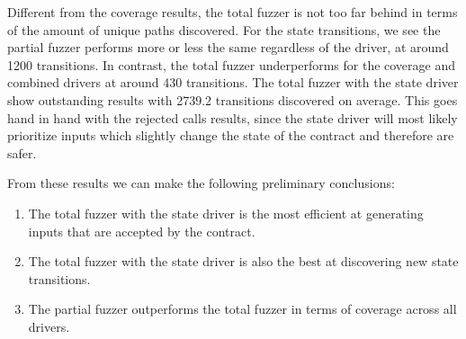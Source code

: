 Different from the coverage results, the total fuzzer is not too far behind in terms of the amount of unique paths discovered.
For the state transitions, we see the partial fuzzer performs more or less the same regardless of the driver, at around 1200 transitions.
In contrast, the total fuzzer underperforms for the coverage and combined drivers at around 430 transitions.
The total fuzzer with the state driver show outstanding results with 2739.2 transitions discovered on average.
This goes hand in hand with the rejected calls results, since the state driver will most likely prioritize inputs which slightly change the state of the contract and therefore are safer.

\begin{mybox}
    From these results we can make the following preliminary conclusions:
    \begin{enumerate}
        \item The total fuzzer with the state driver is the most efficient at generating inputs that are accepted by the contract.
        \item The total fuzzer with the state driver is also the best at discovering new state transitions.
        \item The partial fuzzer outperforms the total fuzzer in terms of coverage across all drivers.
    \end{enumerate}
\end{mybox}